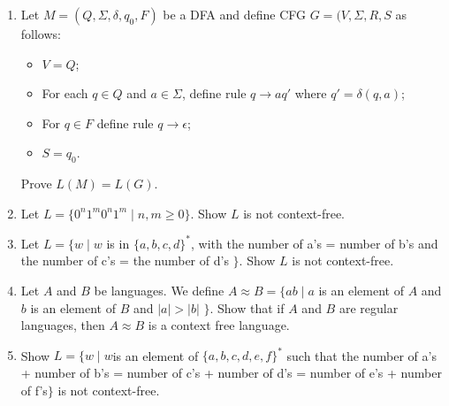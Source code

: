 \documentclass{article}
\begin{document}
\begin{enumerate}
        \item Let $M=(Q,\Sigma, \delta, q_0, F)$ be a DFA and define CFG $G=(V,\Sigma,R,S$ as follows:
            \begin{itemize}
                \item $V = Q$;
                \item For each $q\in Q$ and $ a\in \Sigma $, define rule $q\rightarrow aq'$ where $q'=\delta(q,a)$;
                \item For $q\in F$ define rule $q\rightarrow\epsilon$;
                \item $S=q_0$.
            \end{itemize}
            Prove $L(M) = L(G)$.

        \item Let $L=\{0^n1^m0^n1^m \mid n,m \geq 0\}$. Show $L$ is not context-free.

        \item Let $L=\{w\mid w $ is in $\{a,b,c,d\}^*$, with the number of a's = number of b's and the number of c's = the number of d's $\}$. Show $L$ is not context-free.

        \item Let $A$ and $B$ be languages. We define $A\approx B = \{ab \mid a $ is an element of $A$ and $b$ is an element of $B$ and $|a| > |b|$ $\}$. Show that if $A$ and $B$ are regular languages, then $A\approx B$ is a context free language.

        \item Show $L = \{w\mid w $is an element of $\{a,b,c,d,e,f\}^*$ such that the number of a's + number of b's = number of c's + number of d's = number of e's + number of f's$ \}$ is not context-free.
    \end{enumerate}
\end{document}
